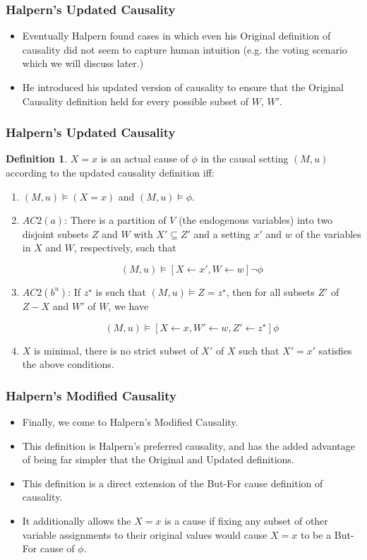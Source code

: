 \documentclass{beamer}
\theoremstyle{plain}
\theoremstyle{definition}
\newtheorem{defn}[thm]{Definition} %
\begin{document}
\begin{frame}
\frametitle{Halpern's Updated Causality}
\begin{itemize}


\item Eventually Halpern found cases in which even his Original definition of causality did not seem to capture human intuition (e.g. the voting scenario which we will discuss later.)
\item He introduced his updated version of causality to ensure that the Original Causality definition held for every possible subset of $W$, $W'$.
\end{itemize}
\end{frame}


\begin{frame}
\frametitle{Halpern's Updated Causality}
\begin{defn}$X=x$ is an actual cause of $\phi$ in the causal setting $(M,u)$ according to the updated causality definition iff:
\begin{enumerate}
\item $(M,u) \models (X=x)$ and $(M,u) \models \phi$.
\item $AC2(a)$: There is a partition of $V$ (the endogenous variables) into two disjoint subsets $Z$ and $W$ with $X'\subseteq Z'$ and a setting $x'$ and $w$ of the variables in $X$ and $W$, respectively, such that

\[
(M,u) \models [X\leftarrow x', W\leftarrow w]\lnot \phi
\] 

\item $AC2(b^u)$: If $z^\star$ is such that $(M,u)\models Z = z^\star$, then for all subsets $Z'$ of $Z-X$ and $W'$ of $W$, we have

\[
(M,u) \models [X\leftarrow x, W' \leftarrow w, Z' \leftarrow z^\star]\phi
\] 

\item $X$ is minimal, there is no strict subset of $X'$ of $X$ such that $X' = x'$ satisfies the above conditions.
\end{enumerate}

\end{defn}
\end{frame}



\begin{frame}
\frametitle{Halpern's Modified Causality}
\begin{itemize}
\item Finally, we come to Halpern's Modified Causality.
\item This definition is Halpern's preferred causality, and has the added advantage of being far simpler that the Original and Updated definitions.
\item This definition is a direct extension of the But-For cause definition of causality.
\item It additionally allows the $X=x$ is a cause if fixing any subset of other variable assignments to their original values would cause $X=x$ to be a But-For cause of $\phi$.
\end{itemize}

\end{frame}
\end{document}
